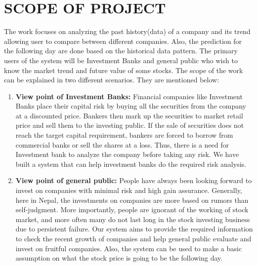 \section{SCOPE OF PROJECT}
The work focuses on analyzing the past history(data) of a company and its trend allowing user to compare between different companies. Also, the prediction for the following day are done based on the historical data pattern. The primary users of the system will be Investment Banks and general public who wish to know the market trend and future value of some stocks. The scope of the work can be explained in two different scenarios. They are mentioned below:

\begin{enumerate}
	\item \textbf{View point of Investment Banks: }Financial companies like Investment Banks place their capital risk by buying all the securities from the company at a discounted price. Bankers then mark up the securities to market retail price and sell them to the investing public. If the sale of securities does not reach the target capital requirement, bankers are forced to borrow from commercial banks or sell the shares at a loss. Thus, there is a need for Investment bank to analyze the company before taking any risk. We have built a system that can help investment banks do the required risk analysis.
	\item \textbf{View point of general public: }People have  always been looking forward to invest on companies with minimal risk and high gain assurance. Generally, here in Nepal, the investments on companies are more based on rumors than self-judgment. More importantly, people are ignorant of the working of stock market, and more often many do not last long in the stock investing business due to persistent failure. Our system aims to provide the required information to check the recent growth of companies and help general public evaluate and invest on fruitful companies. 
Also, the system can be used to make a basic assumption on what the stock price is going to be the following day. 

\end{enumerate}
